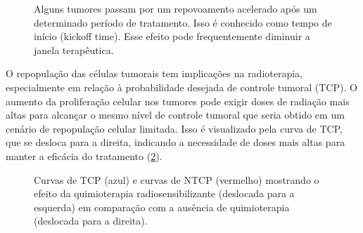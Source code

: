 \documentclass[11pt,a4paper]{article}
\begin{document}
	\begin{figure}[h]
		\centering
		\caption{Alguns tumores passam por um repovoamento acelerado após um determinado período de tratamento. Isso é conhecido como tempo de início (kickoff time). Esse efeito pode frequentemente diminuir a janela terapêutica.}
		\label{fig:repopulacaoAcelerada}
	\end{figure}

	O repopulação das células tumorais tem implicações na radioterapia, especialmente em relação à probabilidade desejada de controle tumoral (TCP). O aumento da proliferação celular nos tumores pode exigir doses de radiação mais altas para alcançar o mesmo nível de controle tumoral que seria obtido em um cenário de repopulação celular limitada. Isso é visualizado pela curva de TCP, que se desloca para a direita, indicando a necessidade de doses mais altas para manter a eficácia do tratamento (\ref{fig:tcpNtcpEQT}).

	\begin{figure}[h]
		\centering
		\caption{Curvas de TCP (azul) e curvas de NTCP (vermelho) mostrando o efeito da quimioterapia radiosensibilizante (deslocada para a esquerda) em comparação com a ausência de quimioterapia (deslocada para a direita).}
		\label{fig:tcpNtcpEQT}
	\end{figure}
\end{document}
